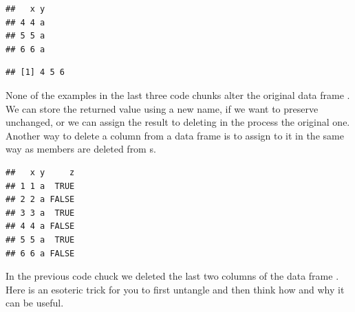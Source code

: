 \documentclass[krantz2]{krantz}\usepackage{knitr}%
\begin{document}
\begin{knitrout}\footnotesize
{}\color{fgcolor}\begin{kframe}
\begin{alltt}
 \hlopt{>} \hlstd{)[ ,} \hlopt{-}\hlstd{]}
\end{alltt}
\begin{verbatim}
##   x y
## 4 4 a
## 5 5 a
## 6 6 a
\end{verbatim}
\begin{alltt}
 \hlopt{>} \hlstd{)}\hlopt{$}
\end{alltt}
\begin{verbatim}
## [1] 4 5 6
\end{verbatim}
\end{kframe}
\end{knitrout}

None of the examples in the last three code chunks alter the original data frame . We can store the returned value using a new name, if we want to preserve  unchanged, or we can assign the result to  deleting in the process the original one. Another way to delete a column from a data frame is to assign  to it in the same way as members are deleted from s.

\begin{knitrout}\footnotesize
{}\color{fgcolor}\begin{kframe}
\begin{alltt}
\hlstd{a.df[[}\hlstd{]]} \hlkwb{<-} 
\hlopt{$} \hlkwb{<-} 
\end{alltt}
\begin{verbatim}
##   x y     z
## 1 1 a  TRUE
## 2 2 a FALSE
## 3 3 a  TRUE
## 4 4 a FALSE
## 5 5 a  TRUE
## 6 6 a FALSE
\end{verbatim}
\end{kframe}
\end{knitrout}

\begin{playground}
In the previous code chuck we deleted the last two columns of the data frame .
Here is an esoteric trick for you to first untangle and then think how and why it can be useful.

\begin{knitrout}\footnotesize
{}\color{fgcolor}\begin{kframe}
\begin{alltt}
\hlstd{a.df[}\hlopt{:}\hlstd{,} \hlstd{(}\hlstd{,}\hlstd{)]} \hlkwb{<-} \hlstd{a.df[}\hlopt{:}\hlstd{,} \hlstd{(}\hlstd{,}\hlstd{)]}
\end{alltt}
\end{kframe}
\end{knitrout}
\end{playground}
\end{document}
